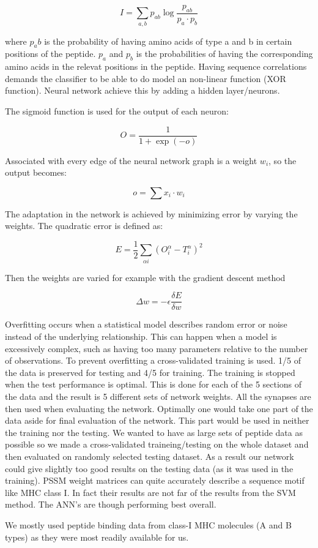 \begin{equation}
\label{mutinfo}
I = \sum_{a,b}{ p_{ab}\log{ \frac{ p_{ab} }{ p_a \cdot p_b } } }
\end{equation}

where $p_ab$ is the probability of having amino acids of type a and b in certain positions of the peptide. $p_a$ and $p_b$ is the probabilities of having the corresponding amino acids in the relevat positions in the peptide.
Having sequence correlations demands the classifier to be able to do model an non-linear function (XOR function). Neural network achieve this by adding a hidden layer/neurons.

The sigmoid function is used for the output of each neuron:

\begin{equation}
O = \frac{1}{1+\exp{(-o)}}
\end{equation}

Associated with every edge of the neural network graph is a weight $w_i$, so the output becomes:

\begin{equation}
o = \sum{x_i \cdot w_i}
\end{equation}

The adaptation in the network is achieved by minimizing error by varying the weights. The quadratic error is defined as:

\begin{equation}
E = \frac{1}{2}\sum_{\alpha i}{(O_i^\alpha - T_i^\alpha)^2}
\end{equation}

Then the weights are varied for example with the gradient descent method

\begin{equation}
\Delta w = -\epsilon \frac{\delta E}{\delta w}
\end{equation}

Overfitting occurs when a statistical model describes random error or noise instead of the underlying relationship.
This can happen when a model is excessively complex, such as having too many parameters relative to the number of observations.
To prevent overfitting a cross-validated training is used. 1/5 of the data is preserved for testing and 4/5 for training. 
The training is stopped when the test performance is optimal. This is done for each of the 5 sections of the data and the result is 5 different sets of network weights.
All the synapses are then used when evaluating the network.
Optimally one would take one part of the data aside for final evaluation of the network. This part would be used in neither the training nor the testing.
We wanted to have as large sets of peptide data as possible so we made a cross-validated traineing/testing on the whole dataset and then evaluated on randomly selected testing dataset.
As a result our network could give slightly too good results on the testing data (as it was used in the training).
PSSM weight matrices can quite accurately describe a sequence motif like MHC class I. In fact their results are not far of the results from the SVM method.
The ANN's are though performing best overall.

We mostly used peptide binding data from class-I MHC molecules (A and B types) as they were most readily available for us.


